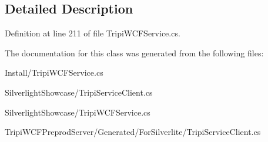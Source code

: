 \subsection{Detailed Description}


Definition at line 211 of file TripiWCFService.cs.

The documentation for this class was generated from the following files:\begin{DoxyCompactItemize}
\item 
Install/TripiWCFService.cs\item 
SilverlightShowcase/TripiServiceClient.cs\item 
SilverlightShowcase/TripiWCFService.cs\item 
TripiWCFPreprodServer/Generated/ForSilverlite/TripiServiceClient.cs\end{DoxyCompactItemize}
